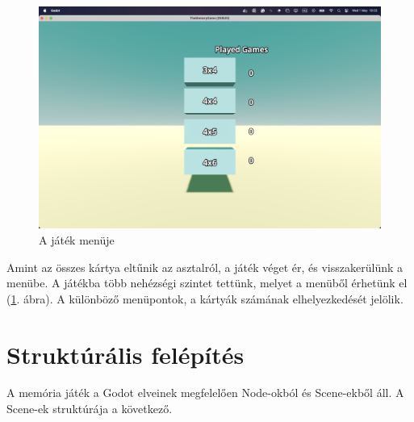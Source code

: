 \begin{figure}
    \centering
    \includegraphics[width=\textwidth]{img/menu.png}
    \caption{A játék menüje}
    \label{img:menu}  
\end{figure}

Amint az összes kártya eltűnik az asztalról, a játék véget ér, és visszakerülünk a menübe.
A játékba több nehézségi szintet tettünk, melyet a menüből érhetünk el (\ref{img:menu}. ábra). A különböző menüpontok, a kártyák számának elhelyezkedését jelölik.

\section{Struktúrális felépítés}
A memória játék a Godot elveinek megfelelően Node-okból és Scene-ekből \cite{godotengineNodesScenes} áll. A Scene-ek struktúrája a következő.
